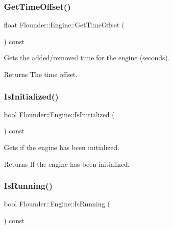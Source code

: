 \subsubsection{\texorpdfstring{Get\+Time\+Offset()}{GetTimeOffset()}}
{\footnotesize\ttfamily float Flounder\+::\+Engine\+::\+Get\+Time\+Offset (\begin{DoxyParamCaption}{ }\end{DoxyParamCaption}) const\hspace{0.3cm}{\ttfamily [inline]}}



Gets the added/removed time for the engine (seconds). 

\begin{DoxyReturn}{Returns}
The time offset. 
\end{DoxyReturn}
\mbox{\label{class_flounder_1_1_engine_a34ce5b2fc002f2da635e4c01f4da6311}} 
\subsubsection{\texorpdfstring{Is\+Initialized()}{IsInitialized()}}
{\footnotesize\ttfamily bool Flounder\+::\+Engine\+::\+Is\+Initialized (\begin{DoxyParamCaption}{ }\end{DoxyParamCaption}) const\hspace{0.3cm}{\ttfamily [inline]}}



Gets if the engine has been initialized. 

\begin{DoxyReturn}{Returns}
If the engine has been initialized. 
\end{DoxyReturn}
\mbox{\label{class_flounder_1_1_engine_a076fc8a5189c7ce72cf0eca02f6827d4}} 
\subsubsection{\texorpdfstring{Is\+Running()}{IsRunning()}}
{\footnotesize\ttfamily bool Flounder\+::\+Engine\+::\+Is\+Running (\begin{DoxyParamCaption}{ }\end{DoxyParamCaption}) const\hspace{0.3cm}{\ttfamily [inline]}}




